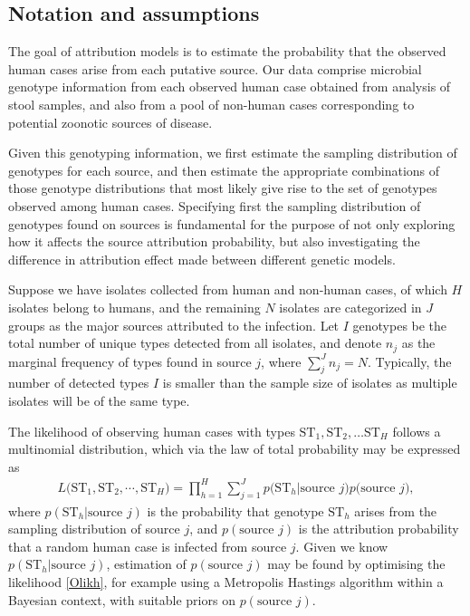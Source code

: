 \documentclass[AMA,STIX1COL]{WileyNJD-v2}
\begin{document}
\subsection{Notation and assumptions}
The goal of attribution models is to estimate the probability that the observed human cases arise from each putative source. Our data comprise microbial genotype information from each observed human case obtained from analysis of stool samples, and also from a pool of non-human cases corresponding to potential zoonotic sources of disease.

Given this genotyping information, we first estimate the sampling distribution of genotypes for each source, and then estimate the appropriate combinations of those genotype distributions that most likely give rise to the set of genotypes observed among human cases. Specifying first the sampling distribution of genotypes found on sources is fundamental for the purpose of not only exploring how it affects the source attribution probability, but also investigating the difference in attribution effect made between different genetic models.

Suppose we have isolates collected from human and non-human cases, of which $H$ isolates belong to humans, and the remaining $N$ isolates are categorized in $J$ groups as the major sources attributed to the infection. Let $I$ genotypes be the total number of unique types detected from all isolates, and denote $n_j$ as the marginal frequency of types found in source $j$, where $\sum_j^J n_j = N$. Typically, the number of detected types $I$ is smaller than the sample size of isolates as multiple isolates will be of the same type.

The likelihood of observing human cases with types $\text{ST}_1, \text{ST}_2, \ldots \text{ST}_H$ follows a multinomial distribution, which via the law of total probability may be expressed as
\begin{align}
  L\Big(\text{ST}_1, \text{ST}_2, \cdots, \text{ST}_H \Big)=\prod_{h=1}^{H}\sum_{j=1}^{J} p\Big(\text{ST}_h \vert \text{source } j\Big) p\Big(\text{source }j\Big),
  \label{Olikh}
\end{align}
where $p(\text{ST}_h \vert \text{source }j)$ is the probability that genotype $\text{ST}_h$ arises from the sampling distribution of source $j$, and $p(\text{source }j)$ is the attribution probability that a random human case is infected from source $j$. Given we know $p(\text{ST}_h \vert \text{source }j)$, estimation of $p(\text{source }j)$ may be found by optimising the likelihood \eqref{Olikh}, for example using a Metropolis Hastings algorithm within a Bayesian context, with suitable priors on $p(\text{source }j)$.
\end{document}
